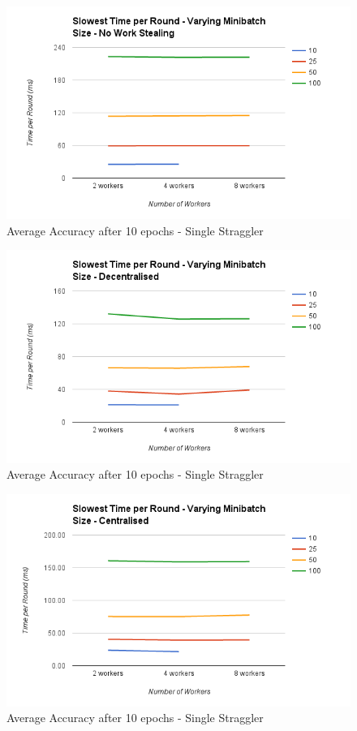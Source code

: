 \documentclass[12pt]{article}
\begin{document}
\begin{figure}[H]
  \centering
  \includegraphics[width=6in]{SlowestMinibatchNo}
  \caption[]{Average Accuracy after 10 epochs - Single Straggler}
  \label{SlowestMinibatchNo}
\end{figure}

\begin{figure}[H]
  \centering
  \includegraphics[width=6in]{SlowestMinibatchDecentralised}
  \caption[]{Average Accuracy after 10 epochs - Single Straggler}
  \label{SlowestMinibatchDecentralised}
\end{figure}

\begin{figure}[H]
  \centering
  \includegraphics[width=6in]{SlowestMinibatchCentralised}
  \caption[]{Average Accuracy after 10 epochs - Single Straggler}
  \label{SlowestMinibatchCentralised}
\end{figure}
\end{document}
